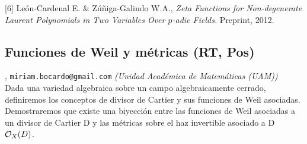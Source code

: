[6] {\sc Le\'on-Cardenal E. \& Z\'u\~niga-Galindo W.A.}, \textit{Zeta Functions for Non-degenerate Laurent Polynomials in Two Variables Over $p$-adic Fields.} Preprint, 2012.
\subsection{\sffamily Funciones de Weil y m\'etricas {\footnotesize (RT, Pos)}} \label{reg-511} 
, {\tt miriam.bocardo@gmail.com}  {\slshape (Unidad Acad\'emica de Matem\'aticas (UAM))}\\
          \noindent Dada una variedad algebraica sobre un campo algebraicamente cerrado, definiremos los conceptos de divisor de Cartier y sus funciones de Weil asociadas. Demostraremos que existe una biyecci\'on entre las funciones de Weil asociadas a un divisor de Cartier D y las m\'etricas sobre el haz invertible asociado a D ${\cal O}_{X}(D)$.
